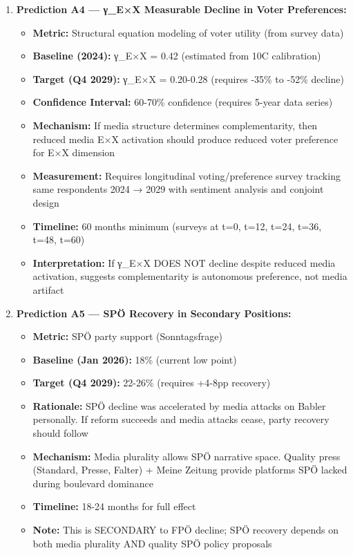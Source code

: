 \begin{enumerate}
\item \textbf{Prediction A4 — γ_{E×X} Measurable Decline in Voter Preferences:}
  \begin{itemize}
  \item \textbf{Metric:} Structural equation modeling of voter utility (from survey data)
  \item \textbf{Baseline (2024):} γ_{E×X} = 0.42 (estimated from 10C calibration)
  \item \textbf{Target (Q4 2029):} γ_{E×X} = 0.20-0.28 (requires -35\% to -52\% decline)
  \item \textbf{Confidence Interval:} 60-70\% confidence (requires 5-year data series)
  \item \textbf{Mechanism:} If media structure determines complementarity, then reduced
    media E×X activation should produce reduced voter preference for E×X dimension
  \item \textbf{Measurement:} Requires longitudinal voting/preference survey tracking same
    respondents 2024 → 2029 with sentiment analysis and conjoint design
  \item \textbf{Timeline:} 60 months minimum (surveys at t=0, t=12, t=24, t=36, t=48, t=60)
  \item \textbf{Interpretation:} If γ_{E×X} DOES NOT decline despite reduced media activation,
    suggests complementarity is autonomous preference, not media artifact
  \end{itemize}

\item \textbf{Prediction A5 — SPÖ Recovery in Secondary Positions:}
  \begin{itemize}
  \item \textbf{Metric:} SPÖ party support (Sonntagsfrage)
  \item \textbf{Baseline (Jan 2026):} 18\% (current low point)
  \item \textbf{Target (Q4 2029):} 22-26\% (requires +4-8pp recovery)
  \item \textbf{Rationale:} SPÖ decline was accelerated by media attacks on Babler personally.
    If reform succeeds and media attacks cease, party recovery should follow
  \item \textbf{Mechanism:} Media plurality allows SPÖ narrative space. Quality press (Standard,
    Presse, Falter) + Meine Zeitung provide platforms SPÖ lacked during boulevard dominance
  \item \textbf{Timeline:} 18-24 months for full effect
  \item \textbf{Note:} This is SECONDARY to FPÖ decline; SPÖ recovery depends on both
    media plurality AND quality SPÖ policy proposals
  \end{itemize}

\end{enumerate}

